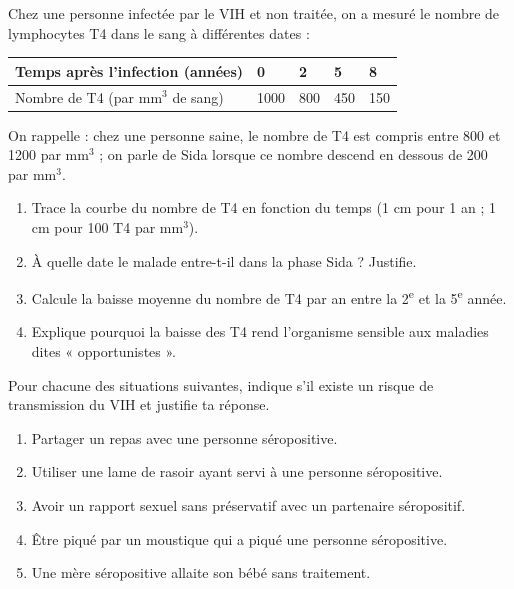 \documentclass[11pt]{article}
\begin{document}
\begin{exercice}
Chez une personne infectée par le VIH et non traitée, on a mesuré le nombre de lymphocytes T4 dans le sang à différentes dates :

\begin{center}
\begin{tabularx}{\linewidth}{|l|X|X|X|X|}
\hline
\rowcolor{popblueL} Temps après l'infection (années) & 0 & 2 & 5 & 8 \\
\hline Nombre de T4 (par mm$^3$ de sang) & 1000 & 800 & 450 & 150 \\
\hline
\end{tabularx}
\end{center}

On rappelle : chez une personne saine, le nombre de T4 est compris entre 800 et \num{1200} par mm$^3$ ; on parle de Sida lorsque ce nombre descend en dessous de 200 par mm$^3$.
\begin{enumerate}
\item Trace la courbe du nombre de T4 en fonction du temps (1 cm pour 1 an ; 1 cm pour 100 T4 par mm$^3$).
\item À quelle date le malade entre-t-il dans la phase Sida ? Justifie.
\item Calcule la baisse moyenne du nombre de T4 par an entre la 2\textsuperscript{e} et la 5\textsuperscript{e} année.
\item Explique pourquoi la baisse des T4 rend l'organisme sensible aux maladies dites « opportunistes ».
\end{enumerate}
\end{exercice}

\begin{exercice}
Pour chacune des situations suivantes, indique s'il existe un risque de transmission du VIH et justifie ta réponse.
\begin{enumerate}
\item Partager un repas avec une personne séropositive.
\item Utiliser une lame de rasoir ayant servi à une personne séropositive.
\item Avoir un rapport sexuel sans préservatif avec un partenaire séropositif.
\item Être piqué par un moustique qui a piqué une personne séropositive.
\item Une mère séropositive allaite son bébé sans traitement.
\end{enumerate}
\end{exercice}
\end{document}
